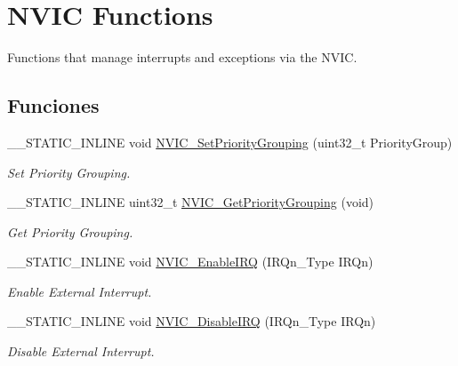 \hypertarget{group___c_m_s_i_s___core___n_v_i_c_functions}{}\section{N\+V\+IC Functions}
\label{group___c_m_s_i_s___core___n_v_i_c_functions}


Functions that manage interrupts and exceptions via the N\+V\+IC.  


\subsection*{Funciones}
\begin{DoxyCompactItemize}
\item 
\+\_\+\+\_\+\+S\+T\+A\+T\+I\+C\+\_\+\+I\+N\+L\+I\+NE void \mbox{\hyperlink{group___c_m_s_i_s___core___n_v_i_c_functions_ga77cfbb35a9d8027e392034321bed6904}{N\+V\+I\+C\+\_\+\+Set\+Priority\+Grouping}} (uint32\+\_\+t Priority\+Group)
\begin{DoxyCompactList}\small\item\em Set Priority Grouping. \end{DoxyCompactList}\item 
\+\_\+\+\_\+\+S\+T\+A\+T\+I\+C\+\_\+\+I\+N\+L\+I\+NE uint32\+\_\+t \mbox{\hyperlink{group___c_m_s_i_s___core___n_v_i_c_functions_ga394f7ce2ca826c0da26284d17ac6524d}{N\+V\+I\+C\+\_\+\+Get\+Priority\+Grouping}} (void)
\begin{DoxyCompactList}\small\item\em Get Priority Grouping. \end{DoxyCompactList}\item 
\+\_\+\+\_\+\+S\+T\+A\+T\+I\+C\+\_\+\+I\+N\+L\+I\+NE void \mbox{\hyperlink{group___c_m_s_i_s___core___n_v_i_c_functions_ga3349f2e3580d7ce22d6530b7294e5921}{N\+V\+I\+C\+\_\+\+Enable\+I\+RQ}} (I\+R\+Qn\+\_\+\+Type I\+R\+Qn)
\begin{DoxyCompactList}\small\item\em Enable External Interrupt. \end{DoxyCompactList}\item 
\+\_\+\+\_\+\+S\+T\+A\+T\+I\+C\+\_\+\+I\+N\+L\+I\+NE void \mbox{\hyperlink{group___c_m_s_i_s___core___n_v_i_c_functions_ga260fba04ac8346855c57f091d4ee1e71}{N\+V\+I\+C\+\_\+\+Disable\+I\+RQ}} (I\+R\+Qn\+\_\+\+Type I\+R\+Qn)
\begin{DoxyCompactList}\small\item\em Disable External Interrupt. \end{DoxyCompactList}\item 

\end{DoxyCompactItemize}

